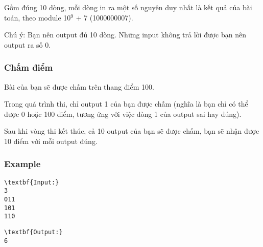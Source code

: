 Gồm đúng 10 dòng, mỗi dòng in ra một số nguyên duy nhất là kết quả của bài toán, theo module 10$^9 $ + 7 (1000000007).

Chú ý: Bạn nên output đủ 10 dòng. Những input không trả lời được bạn nên output ra số 0.
\begin{itemize}
\end{itemize}

\subsubsection{Chấm điểm}

Bài của bạn sẽ được chấm trên thang điểm 100.

Trong quá trình thi, chỉ output 1 của bạn được chấm (nghĩa là bạn chỉ có thể được 0 hoặc 100 điểm, tương ứng với việc dòng 1 của output sai hay đúng).

Sau khi vòng thi kết thúc, cả 10 output của bạn sẽ được chấm, bạn sẽ nhận được 10 điểm với mỗi output đúng.

\subsubsection{Example}
\begin{verbatim}
\textbf{Input:}
3
011
101
110\end{verbatim}
\begin{verbatim}
\textbf{Output:}
6
\end{verbatim}